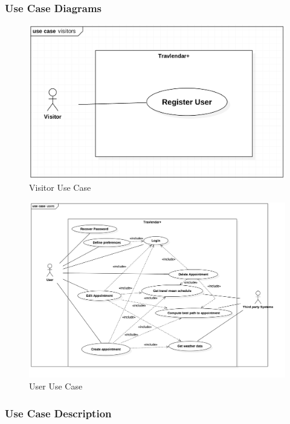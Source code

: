 \documentclass[12pt]{article}
\begin{document}
\subsubsection{Use Case Diagrams}
\begin{figure}[H]
        \includegraphics[scale=0.4]{visitorUseCase.png}
        \centering
        \caption{Visitor Use Case}
    \label{fig:visitorUseCase}
\end{figure}

\begin{figure}[H]
        \includegraphics[scale=0.5]{userUseCase.png}
        \centering
        \caption{User Use Case}
    \label{fig:userUseCase}
\end{figure}
    
\newpage

\subsubsection{Use Case Description}
\end{document}
